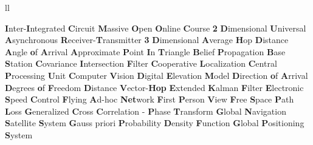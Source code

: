 \begin{abbreviations}{ll} %
    
    		{\textbf{I}nter-\textbf{I}ntegrated \textbf{C}ircuit}
    		{\textbf{M}assive \textbf{O}pen \textbf{O}nline \textbf{C}ourse}
    			{\textbf{2} \textbf{D}imensional}
    		{\textbf{U}niversal \textbf{Α}synchronous \textbf{R}eceiver-\textbf{T}ransmitter}
    			{\textbf{3} \textbf{D}imensional}
    		{\textbf{A}verage \textbf{H}op \textbf{D}istance} 
    		{\textbf{A}ngle \textbf{o}f \textbf{A}rrival}
    		{\textbf{A}pproximate \textbf{P}oint \textbf{I}n \textbf{T}riangle}
    			{\textbf{B}elief \textbf{P}ropagation} 
    			{\textbf{B}ase \textbf{S}tation}
    		{\textbf{C}ovariance \textbf{I}ntersection \textbf{F}ilter}   
    		    {\textbf{C}ooperative \textbf{L}ocalization}
    		{\textbf{C}entral \textbf{P}rocessing \textbf{U}nit}
    		    {\textbf{C}omputer \textbf{V}ision}
    		{\textbf{D}igital \textbf{E}levation \textbf{M}odel}
    		{\textbf{D}irection \textbf{o}f \textbf{A}rrival}
    		{\textbf{D}egrees \textbf{o}f \textbf{F}reedom}
    		{\textbf{D}istance \textbf{V}ector-\textbf{Hop}}
    		{\textbf{E}xtended \textbf{K}alman \textbf{F}ilter}
    		{\textbf{E}lectronic \textbf{S}peed \textbf{C}ontrol}
    		{\textbf{F}lying \textbf{A}d-hoc \textbf{Net}work}
    		{\textbf{F}irst \textbf{P}erson \textbf{V}iew}
    		{\textbf{F}ree \textbf{S}pace \textbf{P}ath \textbf{L}oss}
    	{\textbf{G}eneralized \textbf{C}ross \textbf{C}orrelation - \textbf{P}hase \textbf{T}ransform}
    		{\textbf{G}lobal \textbf{N}avigation \textbf{S}atellite \textbf{S}ystem}
    		{\textbf{G}auss priori \textbf{P}robability \textbf{D}ensity \textbf{F}unction}
    		{\textbf{G}lobal \textbf{P}ositioning \textbf{S}ystem}

\end{abbreviations}
